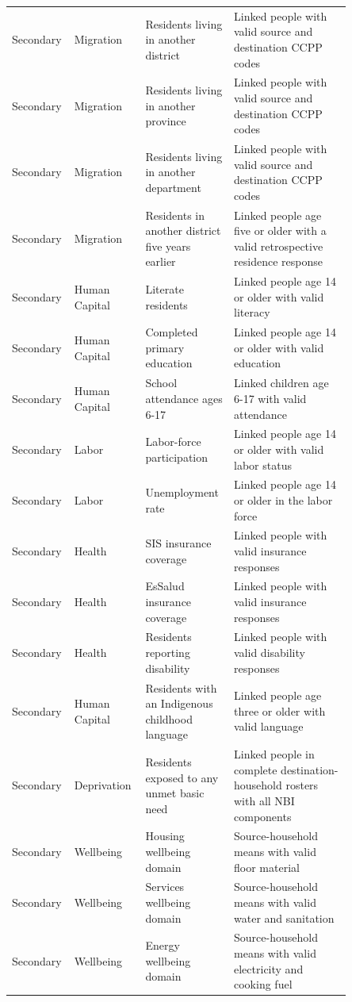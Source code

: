 \begin{longtable}{p{0.10\linewidth}p{0.18\linewidth}p{0.24\linewidth}p{0.33\linewidth}}
Secondary & Migration & Residents living in another district & Linked people with valid source and destination CCPP codes \\
Secondary & Migration & Residents living in another province & Linked people with valid source and destination CCPP codes \\
Secondary & Migration & Residents living in another department & Linked people with valid source and destination CCPP codes \\
Secondary & Migration & Residents in another district five years earlier & Linked people age five or older with a valid retrospective residence response \\
Secondary & Human Capital & Literate residents & Linked people age 14 or older with valid literacy \\
Secondary & Human Capital & Completed primary education & Linked people age 14 or older with valid education \\
Secondary & Human Capital & School attendance ages 6-17 & Linked children age 6-17 with valid attendance \\
Secondary & Labor & Labor-force participation & Linked people age 14 or older with valid labor status \\
Secondary & Labor & Unemployment rate & Linked people age 14 or older in the labor force \\
Secondary & Health & SIS insurance coverage & Linked people with valid insurance responses \\
Secondary & Health & EsSalud insurance coverage & Linked people with valid insurance responses \\
Secondary & Health & Residents reporting disability & Linked people with valid disability responses \\
Secondary & Human Capital & Residents with an Indigenous childhood language & Linked people age three or older with valid language \\
Secondary & Deprivation & Residents exposed to any unmet basic need & Linked people in complete destination-household rosters with all NBI components \\
Secondary & Wellbeing & Housing wellbeing domain & Source-household means with valid floor material \\
Secondary & Wellbeing & Services wellbeing domain & Source-household means with valid water and sanitation \\
Secondary & Wellbeing & Energy wellbeing domain & Source-household means with valid electricity and cooking fuel \\

\end{longtable}
